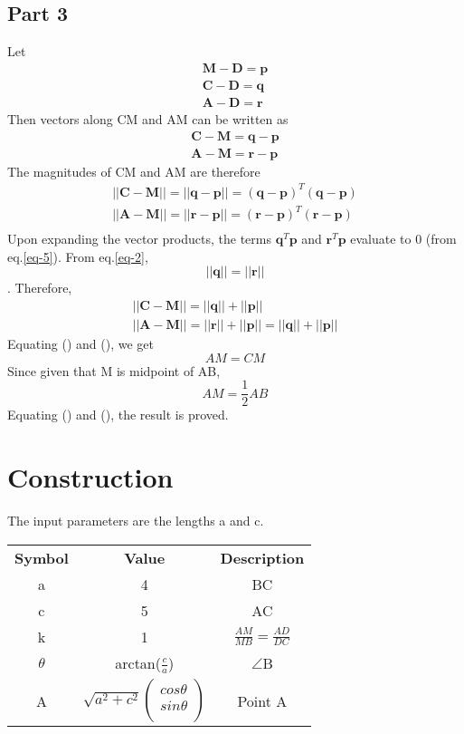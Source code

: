\documentclass[journal,10pt,twocolumn]{article}
\begin{document}
\subsection*{Part 3}
Let
\begin{eqnarray}
	\boldsymbol{M-D} = \boldsymbol{p}\\
	\boldsymbol{C-D} = \boldsymbol{q}\\
	\boldsymbol{A-D} = \boldsymbol{r}
\end{eqnarray}
Then vectors along CM and AM can be written as
\begin{eqnarray}
	\boldsymbol{C-M} = \boldsymbol{q-p}\\
	\boldsymbol{A-M} = \boldsymbol{r-p}
\end{eqnarray}
The magnitudes of CM and AM are therefore
\begin{eqnarray}
	||\boldsymbol{C-M}|| = ||\boldsymbol{q-p}|| = (\boldsymbol{q-p})^T(\boldsymbol{q-p})\\
	||\boldsymbol{A-M}|| = ||\boldsymbol{r-p}|| = (\boldsymbol{r-p})^T(\boldsymbol{r-p})\\
\end{eqnarray}
Upon expanding the vector products, the terms $\boldsymbol{q}^T\boldsymbol{p}$ and $\boldsymbol{r}^T\boldsymbol{p}$ evaluate to 0 (from eq.\ref{eq-5}). From eq.\ref{eq-2}, $$||\boldsymbol{q}|| = ||\boldsymbol{r}||$$. Therefore,
\begin{eqnarray}
||\boldsymbol{C-M}|| = ||\boldsymbol{q}|| + ||\boldsymbol{p}||\\
	||\boldsymbol{A-M}|| = ||\boldsymbol{r}|| + ||\boldsymbol{p}|| = ||\boldsymbol{q}|| + ||\boldsymbol{p}||
\end{eqnarray}
Equating () and (), we get $$AM = CM$$
Since given that M is midpoint of AB, $$AM = \frac{1}{2}AB$$
Equating () and (), the result is proved.
\section*{Construction}
The input parameters are the lengths a and c.
\begin{tabular}{|c|c|c|}
	\textbf{Symbol}&\textbf{Value}&\textbf{Description}\\
	a&4&BC\\
	c&5&AC\\
	k&1&$\frac{AM}{MB} = \frac{AD}{DC}$\\
	$\theta$&arctan($\frac{c}{a}$)&$\angle$B\\
	A&$\sqrt{a^2+c^2}%
	\begin{pmatrix}
		cos\theta\\
		sin\theta\\
	\end{pmatrix}$%
	&Point A
\end{tabular}
\end{document}
